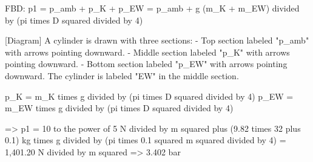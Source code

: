FBD:  
p1 = p_amb + p_K + p_EW = p_amb + g (m_K + m_EW) divided by (pi times D squared divided by 4)  

[Diagram]  
A cylinder is drawn with three sections:  
- Top section labeled "p_amb" with arrows pointing downward.  
- Middle section labeled "p_K" with arrows pointing downward.  
- Bottom section labeled "p_EW" with arrows pointing downward.  
The cylinder is labeled "EW" in the middle section.  

p_K = m_K times g divided by (pi times D squared divided by 4)  
p_EW = m_EW times g divided by (pi times D squared divided by 4)  

=> p1 = 10 to the power of 5 N divided by m squared plus (9.82 times 32 plus 0.1) kg times g divided by (pi times 0.1 squared m squared divided by 4)  
= 1,401.20 N divided by m squared  
=> 3.402 bar